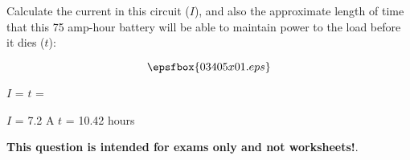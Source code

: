 

Calculate the current in this circuit ($I$), and also the approximate length of time that this 75 amp-hour battery will be able to maintain power to the load before it dies ($t$):

$$\epsfbox{03405x01.eps}$$

$I$ = \hskip 150pt $t$ = 







$I$ = 7.2 A \hskip 100pt $t$ = 10.42 hours







{\bf This question is intended for exams only and not worksheets!}.



